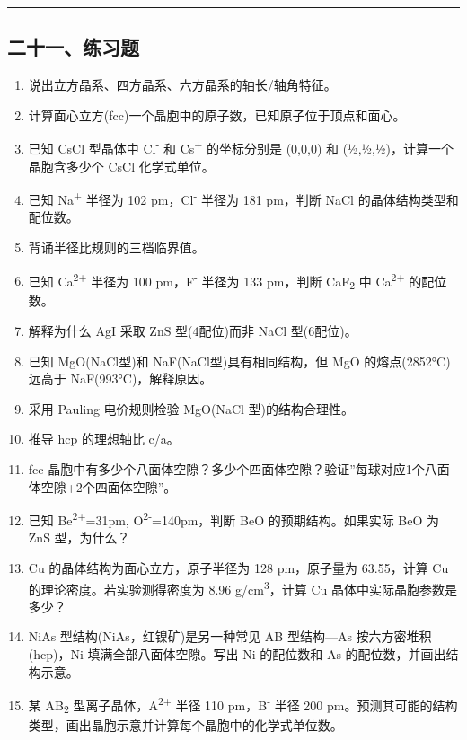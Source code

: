\begin{center}\rule{0.5\linewidth}{0.5pt}\end{center}

\subsection{二十一、练习题}\label{ux4e8cux5341ux4e00ux7ec3ux4e60ux9898}

\begin{enumerate}
\def\labelenumi{\arabic{enumi}.}
\item
  说出立方晶系、四方晶系、六方晶系的轴长/轴角特征。
\item
  计算面心立方(fcc)一个晶胞中的原子数，已知原子位于顶点和面心。
\item
  已知 CsCl 型晶体中 Cl\textsuperscript{-} 和 Cs\textsuperscript{+} 的坐标分别是 (0,0,0) 和 (½,½,½)，计算一个晶胞含多少个 CsCl 化学式单位。
\item
  已知 Na\textsuperscript{+} 半径为 102 pm，Cl\textsuperscript{-} 半径为 181 pm，判断 NaCl 的晶体结构类型和配位数。
\item
  背诵半径比规则的三档临界值。
\item
  已知 Ca\textsuperscript{2+} 半径为 100 pm，F\textsuperscript{-} 半径为 133 pm，判断 CaF\textsubscript{2} 中 Ca\textsuperscript{2+} 的配位数。
\item
  解释为什么 AgI 采取 ZnS 型(4配位)而非 NaCl 型(6配位)。
\item
  已知 MgO(NaCl型)和 NaF(NaCl型)具有相同结构，但 MgO 的熔点(2852°C)远高于 NaF(993°C)，解释原因。
\item
  采用 Pauling 电价规则检验 MgO(NaCl 型)的结构合理性。
\item
  推导 hcp 的理想轴比 c/a。
\item
  fcc 晶胞中有多少个八面体空隙？多少个四面体空隙？验证''每球对应1个八面体空隙+2个四面体空隙''。
\item
  已知 Be\textsuperscript{2+}=31pm, O\textsuperscript{2-}=140pm，判断 BeO 的预期结构。如果实际 BeO 为 ZnS 型，为什么？
\item
  Cu 的晶体结构为面心立方，原子半径为 128 pm，原子量为 63.55，计算 Cu 的理论密度。若实验测得密度为 8.96 g/cm\textsuperscript{3}，计算 Cu 晶体中实际晶胞参数是多少？
\item
  NiAs 型结构(NiAs，红镍矿)是另一种常见 AB 型结构---As 按六方密堆积(hcp)，Ni 填满全部八面体空隙。写出 Ni 的配位数和 As 的配位数，并画出结构示意。
\item
  某 AB\textsubscript{2} 型离子晶体，A\textsuperscript{2+} 半径 110 pm，B\textsuperscript{-} 半径 200 pm。预测其可能的结构类型，画出晶胞示意并计算每个晶胞中的化学式单位数。
\end{enumerate}


